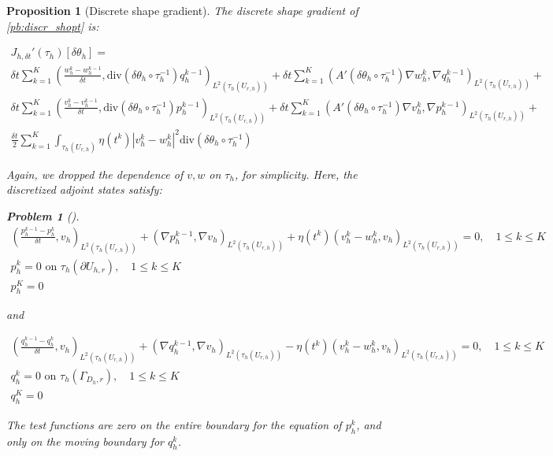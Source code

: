 \documentclass[english,a4paper,9pt,oneside]{scrbook}	%
\theoremstyle{break}
\newtheorem{prop}[equation]{Proposition}
\newtheorem{pb}[equation]{Problem}
\theoremstyle{remark}
\newcommand{\dive}{\text{div}}
\begin{document}
\begin{prop}[Discrete shape gradient]
\label{prop:discrete_shape_gradient}
The discrete shape gradient of \cref{pb:discr_shopt} is:

\begin{align*}
	J_{h,\delta t}'(\tau_h)[\delta \theta_h] =\\
	\delta t \sum_{k=1}^{K} \left (\frac{w_h^{k}-w_h^{k-1}}{\delta t}, \dive(\delta \theta_h \circ \tau_h^{-1}) q_h^{k-1} \right )_{L^2(\tau_h(U_{r,h}))} + \delta t \sum_{k=1}^{K} (A'(\delta \theta_h \circ \tau_h^{-1}) \nabla w_h^k, \nabla q_h^{k-1})_{L^2(\tau_h(U_{r,h}))}+\\
	\delta t \sum_{k=1}^{K} \left (\frac{v_h^{k}-v_h^{k-1}}{\delta t}, \dive(\delta \theta_h \circ \tau_h^{-1}) p_h^{k-1} \right )_{L^2(\tau_h(U_{r,h}))} + \delta t \sum_{k=1}^{K} (A'(\delta \theta_h \circ \tau_h^{-1}) \nabla v_h^k, \nabla p_h^{k-1})_{L^2(\tau_h(U_{r,h}))}+\\
	\frac{\delta t}{2} \sum_{k=1}^{K} \int_{\tau_h(U_{r,h})} \eta(t^k)|v_h^k-w_h^k|^2  \dive(\delta \theta_h \circ \tau_h^{-1})
\end{align*}

Again, we dropped the dependence of $v,w$ on $\tau_h$, for simplicity. Here, the discretized adjoint states satisfy:

\begin{pb}[]

\begin{align*}
	\left ( \frac{p_h^{k-1}-p_h^k}{\delta t}, v_h\right )_{L^2(\tau_h(U_{r,h}))} + (\nabla p_h^{k-1}, \nabla v_h )_{L^2(\tau_h(U_{r,h}))} + \eta(t^k)(v_h^k-w_h^k,v_h)_{L^2(\tau_h(U_{r,h}))} = 0, \quad 1\leq k \leq K\\
	p_h^k = 0 \text{ on }  \tau_h (\partial U_{h,r}), \quad 1\leq k \leq K\\
	p_h^K=0 
\end{align*}

and 

\begin{align*}
	\left ( \frac{q_h^{k-1}-q_h^k}{\delta t}, v_h\right )_{L^2(\tau_h(U_{r,h}))} + (\nabla q_h^{k-1}, \nabla v_h )_{L^2(\tau_h(U_{r,h}))} - \eta(t^k)(v_h^k-w_h^k,v_h)_{L^2(\tau_h(U_{r,h}))} = 0, \quad 1\leq k \leq K\\
	q_h^k = 0 \text{ on } \tau_h (\Gamma_{D_h,r}), \quad 1\leq k \leq K\\
	q_h^K=0 
\end{align*}

The test functions are zero on the entire boundary for the equation of $p_{h}^k$, and only on the moving boundary for $q_h^k$.

\end{pb}

\end{prop}
\end{document}
